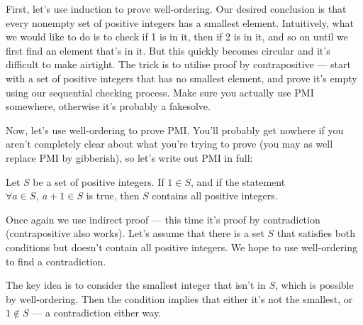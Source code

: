 \documentclass{amsart}
\begin{document}
First, let's use induction to prove well-ordering. Our desired conclusion is
that every nonempty set of positive integers has a smallest element. Intuitively,
what we would like to do is to check if 1 is in it, then if 2 is in it, and so
on until we first find an element that's in it. But this quickly becomes circular
and it's difficult to make airtight. The trick is to utilise proof by
contrapositive --- start with a set of positive integers that has no smallest
element, and prove it's empty using our sequential checking process. Make sure
you actually use PMI somewhere, otherwise it's probably a fakesolve.

Now, let's use well-ordering to prove PMI. You'll probably get nowhere if you
aren't completely clear about what you're trying to prove (you may as well
replace PMI by gibberish), so let's write out PMI in full:

Let $S$ be a set of positive integers. If $1\in S$, and if the statement
$\forall a\in S,\ a+1\in S$ is true, then $S$ contains all positive integers.

Once again we use indirect proof --- this time it's proof by contradiction
(contrapositive also works). Let's assume that there is a set $S$ that satisfies
both conditions but doesn't contain all positive integers. We hope to use
well-ordering to find a contradiction.

The key idea is to consider the smallest integer that isn't in $S$, which is
possible by well-ordering. Then the condition implies that either it's not the
smallest, or $1\not\in S$ --- a contradiction either way.
\end{document}
